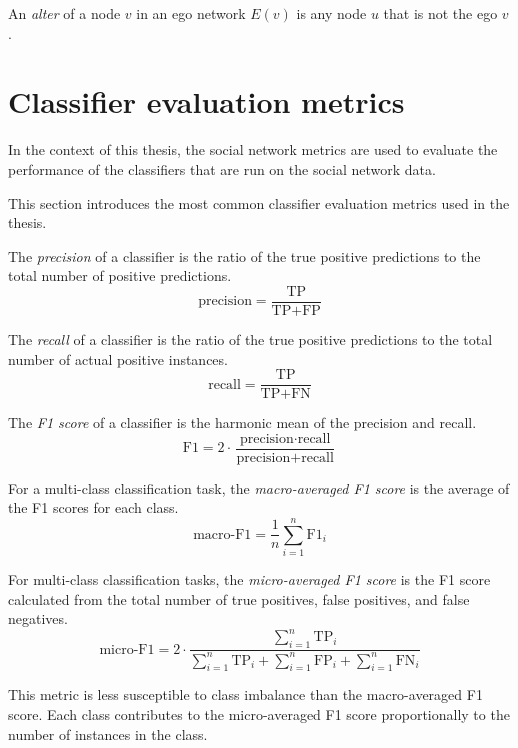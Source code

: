 \begin{definition}
    An \textit{alter} of a node $v$ in an ego network $E(v)$ is any node $u$ that is not the ego $v$.
\end{definition}

\section{Classifier evaluation metrics}

In the context of this thesis, the social network metrics are used to evaluate 
the performance of the classifiers that are run on the social network data.

This section introduces the most common classifier evaluation metrics used in the thesis.

\begin{definition}[Precision]
    The \textit{precision} of a classifier is the ratio of the true positive predictions to the total number of positive predictions.
    $$
    \text{precision} = \frac{\text{TP}}{\text{TP} + \text{FP}}
    $$
\end{definition}

\begin{definition}[Recall]
    The \textit{recall} of a classifier is the ratio of the true positive predictions to the total number of actual positive instances.
    $$
    \text{recall} = \frac{\text{TP}}{\text{TP} + \text{FN}}
    $$
\end{definition}

\begin{definition}[F1 score]
    The \textit{F1 score} of a classifier is the harmonic mean of the precision and recall.
    $$
    \text{F1} = 2 \cdot \frac{\text{precision} \cdot \text{recall}}{\text{precision} + \text{recall}}
    $$
\end{definition}

\begin{definition}
    For a multi-class classification task, the \textit{macro-averaged F1 score} is the average of the F1 scores for each class.
    $$
    \text{macro-F1} = \frac{1}{n} \sum_{i=1}^{n} \text{F1}_i
    $$
\end{definition}

\begin{definition}
    For multi-class classification tasks, the \textit{micro-averaged F1 score} is the F1 score calculated from the total number of true positives, false positives, and false negatives.
    $$
    \text{micro-F1} = 2 \cdot \frac{\sum_{i=1}^{n} \text{TP}_i}{\sum_{i=1}^{n} \text{TP}_i + \sum_{i=1}^{n} \text{FP}_i + \sum_{i=1}^{n} \text{FN}_i}
    $$

    This metric is less susceptible to class imbalance than the macro-averaged F1 score.
    Each class contributes to the micro-averaged F1 score proportionally to the number of instances in the class.
\end{definition}